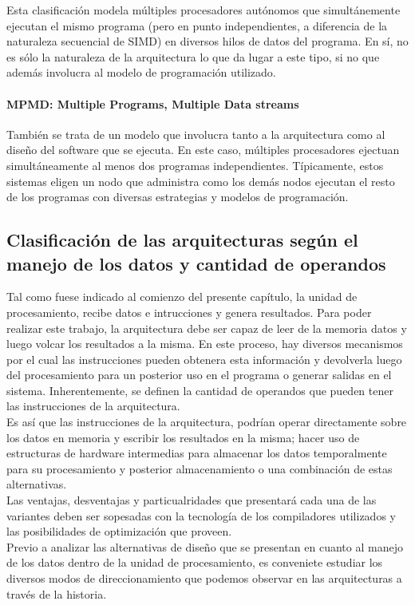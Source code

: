 Esta clasificación modela múltiples procesadores autónomos que simultánemente 
ejecutan el mismo programa (pero en punto independientes, a diferencia de la 
naturaleza secuencial de SIMD) en diversos hilos de datos del programa. En sí, 
no es sólo la naturaleza de la arquitectura lo que da lugar a este tipo, si no 
que además involucra al modelo de programación utilizado.

\paragraph{MPMD: Multiple Programs, Multiple Data streams}
\label{par:theory-modern-flynn_taxonomy-today-MPMD}

También se trata de un modelo que involucra tanto a la arquitectura como al 
diseño del software que se ejecuta. En este caso, múltiples procesadores 
ejectuan simultáneamente al menos dos programas independientes. Típicamente, 
estos sistemas eligen un nodo que administra como los demás nodos ejecutan el 
resto de los programas con diversas estrategias y modelos de programación.

\subsection{Clasificación de las arquitecturas según el manejo de los datos y 
cantidad de operandos}
\label{subsec:theory-modern-data_managment}

Tal como fuese indicado al comienzo del presente capítulo, la unidad de 
procesamiento, recibe datos e intrucciones y genera resultados. Para poder 
realizar este trabajo, la arquitectura debe ser capaz de leer de la memoria 
datos y luego volcar los resultados a la misma. En este proceso, hay diversos 
mecanismos por el cual las instrucciones pueden obtenera esta información y 
devolverla luego del procesamiento para un posterior uso en el programa o 
generar salidas en el sistema. Inherentemente, se definen la cantidad de 
operandos que pueden tener las instrucciones de la arquitectura.\\
Es así que las instrucciones de la arquitectura, podrían operar directamente 
sobre los datos en memoria y escribir los resultados en la misma; hacer uso de 
estructuras de hardware intermedias para almacenar los datos temporalmente para 
su procesamiento y posterior almacenamiento o una combinación de estas 
alternativas.\\
Las ventajas, desventajas y particualridades que presentará cada una de las 
variantes deben ser sopesadas con la tecnología de los compiladores utilizados 
y las posibilidades de optimización que proveen.\\
Previo a analizar las alternativas de diseño que se presentan en cuanto al 
manejo de los datos dentro de la unidad de procesamiento, es conveniete 
estudiar los diversos modos de direccionamiento que podemos observar en las 
arquitecturas a través de la historia.

